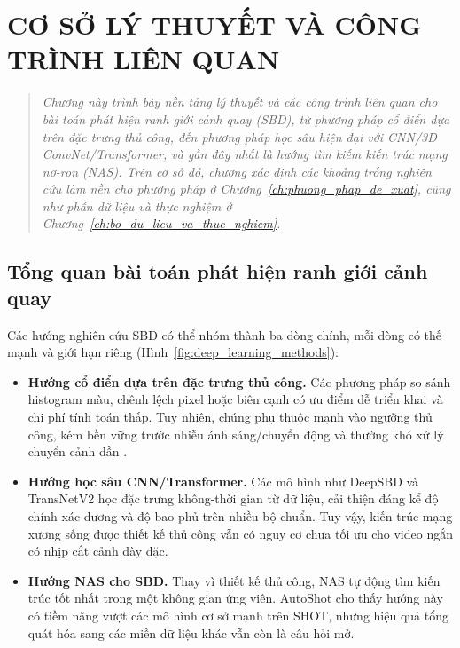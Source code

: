 \chapter{CƠ SỞ LÝ THUYẾT VÀ CÔNG TRÌNH LIÊN QUAN}
\label{cong_trinh_lien_quan}
\vspace{-1.5cm}
\begin{quotation}
\noindent
\small\textit{
Chương này trình bày nền tảng lý thuyết và các công trình liên quan cho bài toán phát hiện ranh giới cảnh quay (SBD), từ phương pháp cổ điển dựa trên đặc trưng thủ công, đến phương pháp học sâu hiện đại với CNN/3D ConvNet/Transformer, và gần đây nhất là hướng tìm kiếm kiến trúc mạng nơ-ron (NAS). Trên cơ sở đó, chương xác định các khoảng trống nghiên cứu làm nền cho phương pháp ở Chương~\ref{ch:phuong_phap_de_xuat}, cũng như phần dữ liệu và thực nghiệm ở Chương~\ref{ch:bo_du_lieu_va_thuc_nghiem}.
}
\end{quotation}
\vspace{1em}

\section{Tổng quan bài toán phát hiện ranh giới cảnh quay}
\label{sec:sbd_overview}
Các hướng nghiên cứu SBD có thể nhóm thành ba dòng chính, mỗi dòng có thế mạnh và giới hạn riêng (Hình~\ref{fig:deep_learning_methods}):
\begin{itemize}
    \item \textbf{Hướng cổ điển dựa trên đặc trưng thủ công.} Các phương pháp so sánh histogram màu, chênh lệch pixel hoặc biên cạnh có ưu điểm dễ triển khai và chi phí tính toán thấp. Tuy nhiên, chúng phụ thuộc mạnh vào ngưỡng thủ công, kém bền vững trước nhiễu ánh sáng/chuyển động và thường khó xử lý chuyển cảnh dần \cite{Abdulhussain2018_SBD_MethodsChallenges}.
    \item \textbf{Hướng học sâu CNN/Transformer.} Các mô hình như DeepSBD \cite{hassanien2017largescale} và TransNetV2 \cite{soucek2020transnetv2} học đặc trưng không-thời gian từ dữ liệu, cải thiện đáng kể độ chính xác dương và độ bao phủ trên nhiều bộ chuẩn. Tuy vậy, kiến trúc mạng xương sống được thiết kế thủ công vẫn có nguy cơ chưa tối ưu cho video ngắn có nhịp cắt cảnh dày đặc.
    \item \textbf{Hướng NAS cho SBD.} Thay vì thiết kế thủ công, NAS \cite{elsken2018_nas_survey,ren2020_nas_survey,white2023_nas1000} tự động tìm kiến trúc tốt nhất trong một không gian ứng viên. AutoShot \cite{zhu2023autoshot} cho thấy hướng này có tiềm năng vượt các mô hình cơ sở mạnh trên SHOT, nhưng hiệu quả tổng quát hóa sang các miền dữ liệu khác vẫn còn là câu hỏi mở.
\end{itemize}

